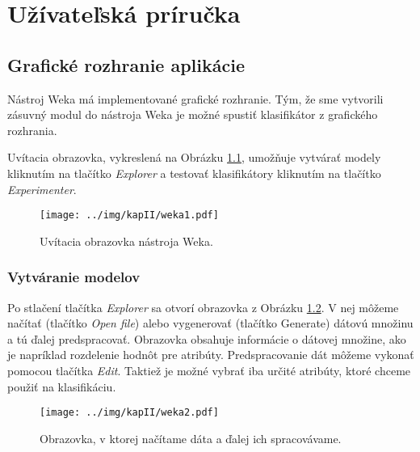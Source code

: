 \chapter{Užívateľská príručka}\label{kapII}
\renewcommand{\figurename}{Obrázok}
\section{Grafické rozhranie aplikácie}
Nástroj Weka má implementované grafické rozhranie.
Tým, že sme vytvorili zásuvný modul do nástroja Weka je možné spustiť klasifikátor z grafického rozhrania. 

Uvítacia obrazovka, vykreslená na Obrázku \ref{fig:gui1}, umožňuje vytvárať modely kliknutím na tlačítko \emph{Explorer} a testovať klasifikátory kliknutím na tlačítko \emph{Experimenter}. 

\begin{figure}[h]
\centering
\centerline{\mbox{\texttt{[image: ../img/kapII/weka1.pdf]}}}
\caption{Uvítacia obrazovka nástroja Weka.}\label{fig:gui1}
\end{figure}

\subsection*{Vytváranie modelov}
Po stlačení tlačítka \emph{Explorer} sa otvorí obrazovka z Obrázku \ref{fig:gui2}. V nej môžeme načítať (tlačítko \emph{Open file}) alebo vygenerovať (tlačítko Generate) dátovú množinu a tú ďalej predspracovať. Obrazovka obsahuje informácie o dátovej množine, ako je napríklad rozdelenie hodnôt pre atribúty. Predspracovanie dát môžeme vykonať pomocou tlačítka \emph{Edit}. Taktiež je možné vybrať iba určité atribúty, ktoré chceme použiť na klasifikáciu.

\begin{figure}[h]
\centering
\centerline{\mbox{\texttt{[image: ../img/kapII/weka2.pdf]}}}
\caption{Obrazovka, v ktorej načítame dáta a ďalej ich spracovávame.}\label{fig:gui2}
\end{figure}

